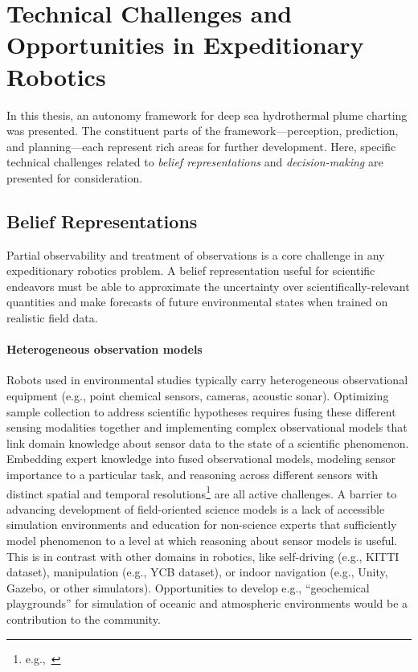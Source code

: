 \section{Technical Challenges and Opportunities in Expeditionary Robotics}
\label{sec:challenges}
In this thesis, an autonomy framework for deep sea hydrothermal plume charting was presented. The constituent parts of the framework---perception, prediction, and planning---each represent rich areas for further development. Here, specific technical challenges related to \emph{belief representations} and \emph{decision-making} are presented for consideration.

\subsection{Belief Representations}
Partial observability and treatment of observations is a core challenge in any expeditionary robotics problem. A belief representation useful for scientific endeavors must be able to approximate the uncertainty over scientifically-relevant quantities and make forecasts of future environmental states when trained on realistic field data. 

\paragraph{Heterogeneous observation models}
Robots used in environmental studies typically carry heterogeneous observational equipment (e.g., point chemical sensors, cameras, acoustic sonar). Optimizing sample collection to address scientific hypotheses requires fusing these different sensing modalities together and implementing complex observational models that link domain knowledge about sensor data to the state of a scientific phenomenon. Embedding expert knowledge into fused observational models, modeling sensor importance to a particular task, and reasoning across different sensors with distinct spatial and temporal resolutions\footnote{e.g.,~\cite{sarkar2014sensor}} are all active challenges. A barrier to advancing development of field-oriented science models is a lack of accessible simulation environments and education for non-science experts that sufficiently model phenomenon to a level at which reasoning about sensor models is useful. This is in contrast with other domains in robotics, like self-driving (e.g., KITTI dataset\autocite{geiger2012we}), manipulation (e.g., YCB dataset\autocite{calli2017yale}), or indoor navigation (e.g., Unity, Gazebo, or other simulators). Opportunities to develop e.g., ``geochemical playgrounds'' for simulation of oceanic and atmospheric environments would be a contribution to the community.

